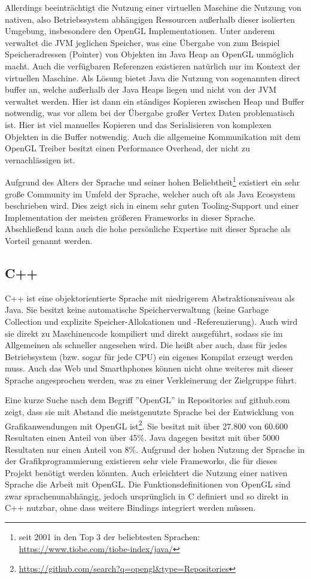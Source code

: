 Allerdings beeinträchtigt die Nutzung einer virtuellen Maschine die Nutzung von nativen, also Betriebssystem abhängigen Ressourcen außerhalb dieser isolierten Umgebung, insbesondere den OpenGL Implementationen. Unter anderem verwaltet die JVM jeglichen Speicher, was eine Übergabe von zum Beispiel Speicheradressen (Pointer) von Objekten im Java Heap an OpenGL unmöglich macht. Auch die verfügbaren Referenzen existieren natürlich nur im Kontext der virtuellen Maschine. Als Lösung bietet Java die Nutzung von sogenannten direct buffer an, welche außerhalb der Java Heaps liegen und nicht von der JVM verwaltet werden. Hier ist dann ein ständiges Kopieren zwischen Heap und Buffer notwendig, was vor allem bei der Übergabe großer Vertex Daten problematisch ist. Hier ist viel manuelles Kopieren und das Serialisieren von komplexen Objekten in die Buffer notwendig. Auch die allgemeine Kommunikation mit dem OpenGL Treiber besitzt einen Performance Overhead, der nicht zu vernachlässigen ist.

Aufgrund des Alters der Sprache und seiner hohen Beliebtheit\footnote{seit 2001 in den Top 3 der beliebtesten Sprachen: \url{https://www.tiobe.com/tiobe-index/java/}} existiert ein sehr große Community im Umfeld der Sprache, welcher auch oft als Java Ecosystem beschrieben wird. Dies zeigt sich in einem sehr guten Tooling-Support und einer Implementation der meisten größeren Frameworks in dieser Sprache. Abschließend kann auch die hohe persönliche Expertise mit dieser Sprache als Vorteil genannt werden.

\subsection{C++}
C++ ist eine objektorientierte Sprache mit niedrigerem Abstraktionsniveau als Java. Sie besitzt keine automatische Speicherverwaltung (keine Garbage Collection und explizite Speicher-Allokationen und -Referenzierung). Auch wird sie direkt zu Maschinencode kompiliert und direkt ausgeführt, sodass sie im Allgemeinen als schneller angesehen wird. Die heißt aber auch, dass für jedes Betriebsystem (bzw. sogar für jede CPU) ein eigenes Kompilat erzeugt werden muss. Auch das Web und Smarthphones können nicht ohne weiteres mit dieser Sprache angesprochen werden, was zu einer Verkleinerung der Zielgruppe führt.

Eine kurze Suche nach dem Begriff ''OpenGL'' in Repositories auf github.com zeigt, dass sie mit Abstand die meistgenutzte Sprache bei der Entwicklung von Grafikanwendungen mit OpenGL ist\footnote{\url{https://github.com/search?q=opengl&type=Repositories}}. Sie besitzt mit über 27.800 von 60.600 Resultaten einen Anteil von über 45\%. Java dagegen besitzt mit über 5000 Resultaten nur einen Anteil von 8\%. Aufgrund der hohen Nutzung der Sprache in der Grafikprogrammierung existieren sehr viele Frameworks, die für dieses Projekt benötigt werden könnten. Auch erleichtert die Nutzung einer nativen Sprache die Arbeit mit OpenGL. Die Funktionsdefinitionen von OpenGL sind zwar sprachenunabhängig, jedoch ursprünglich in C definiert und so direkt in C++ nutzbar, ohne dass weitere Bindings integriert werden müssen.

